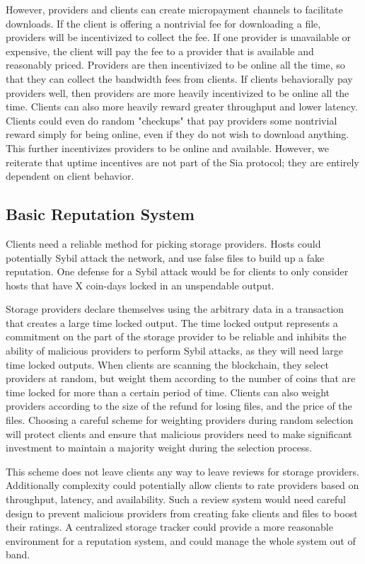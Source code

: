 \documentclass[twocolumn]{article}
\begin{document}
However, providers and clients can create micropayment channels to facilitate downloads.
If the client is offering a nontrivial fee for downloading a file, providers will be incentivized to collect the fee.
If one provider is unavailable or expensive, the client will pay the fee to a provider that is available and reasonably priced.
Providers are then incentivized to be online all the time, so that they can collect the bandwidth fees from clients.
If clients behaviorally pay providers well, then providers are more heavily incentivized to be online all the time.
Clients can also more heavily reward greater throughput and lower latency.
Clients could even do random "checkups" that pay providers some nontrivial reward simply for being online, even if they do not wish to download anything.
This further incentivizes providers to be online and available.
However, we reiterate that uptime incentives are not part of the Sia protocol; they are entirely dependent on client behavior.

\subsection{Basic Reputation System}
Clients need a reliable method for picking storage providers.
Hosts could potentially Sybil attack the network, and use false files to build up a fake reputation.
One defense for a Sybil attack would be for clients to only consider hosts that have X coin-days locked in an unspendable output.

Storage providers declare themselves using the arbitrary data in a transaction that creates a large time locked output.
The time locked output represents a commitment on the part of the storage provider to be reliable and inhibits the ability of malicious providers to perform Sybil attacks, as they will need large time locked outputs.
When clients are scanning the blockchain, they select providers at random, but weight them according to the number of coins that are time locked for more than a certain period of time.
Clients can also weight providers according to the size of the refund for losing files, and the price of the files.
Choosing a careful scheme for weighting providers during random selection will protect clients and ensure that malicious providers need to make significant investment to maintain a majority weight during the selection process.

This scheme does not leave clients any way to leave reviews for storage providers.
Additionally complexity could potentially allow clients to rate providers based on throughput, latency, and availability.
Such a review system would need careful design to prevent malicious providers from creating fake clients and files to boost their ratings.
A centralized storage tracker could provide a more reasonable environment for a reputation system, and could manage the whole system out of band.
\end{document}
